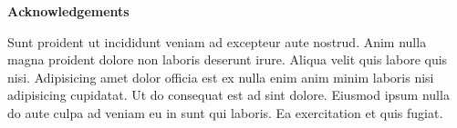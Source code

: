 \pagestyle{empty}
{\textbf{Αcknowledgements}\\[1cm]}

Sunt proident ut incididunt veniam ad excepteur aute nostrud. Anim nulla magna proident dolore non laboris deserunt irure. 
Aliqua velit quis labore quis nisi. Adipisicing amet dolor officia est ex nulla enim anim minim laboris nisi adipisicing cupidatat. 
Ut do consequat est ad sint dolore. Eiusmod ipsum nulla do aute culpa ad veniam eu in sunt qui laboris. Ea exercitation et quis fugiat.
